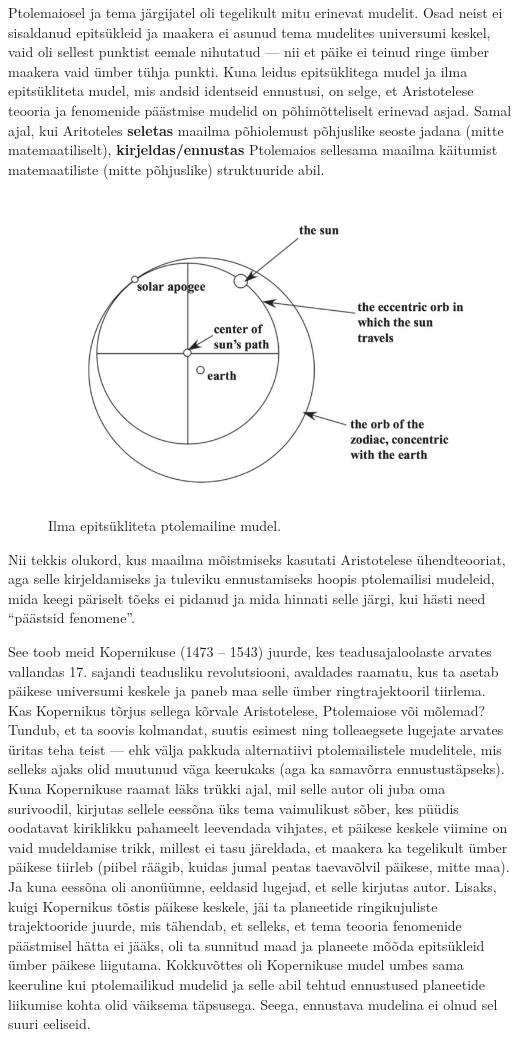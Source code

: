 \documentclass[]{book}
\begin{document}
Ptolemaiosel ja tema järgijatel oli tegelikult mitu erinevat mudelit.
Osad neist ei sisaldanud epitsükleid ja maakera ei asunud tema mudelites
universumi keskel, vaid oli sellest punktist eemale nihutatud --- nii et
päike ei teinud ringe ümber maakera vaid ümber tühja punkti. Kuna leidus
epitsüklitega mudel ja ilma epitsükliteta mudel, mis andsid identseid
ennustusi, on selge, et Aristotelese teooria ja fenomenide päästmise
mudelid on põhimõtteliselt erinevad asjad. Samal ajal, kui Aritoteles
\textbf{seletas} maailma põhiolemust põhjuslike seoste jadana (mitte
matemaatiliselt), \textbf{kirjeldas/ennustas} Ptolemaios sellesama
maailma käitumist matemaatiliste (mitte põhjuslike) struktuuride abil.

\begin{figure}
\includegraphics[width=0.5\linewidth]{img/pt2} \caption{Ilma epitsükliteta ptolemailine mudel.}\label{fig:unnamed-chunk-3}
\end{figure}

Nii tekkis olukord, kus maailma mõistmiseks kasutati Aristotelese
ühendteooriat, aga selle kirjeldamiseks ja tuleviku ennustamiseks hoopis
ptolemailisi mudeleid, mida keegi päriselt tõeks ei pidanud ja mida
hinnati selle järgi, kui hästi need ``päästsid fenomene''.

See toob meid Kopernikuse (1473 -- 1543) juurde, kes teadusajaloolaste
arvates vallandas 17. sajandi teadusliku revolutsiooni, avaldades
raamatu, kus ta asetab päikese universumi keskele ja paneb maa selle
ümber ringtrajektooril tiirlema. Kas Kopernikus tõrjus sellega kõrvale
Aristotelese, Ptolemaiose või mõlemad? Tundub, et ta soovis kolmandat,
suutis esimest ning tolleaegsete lugejate arvates üritas teha teist ---
ehk välja pakkuda alternatiivi ptolemailistele mudelitele, mis selleks
ajaks olid muutunud väga keerukaks (aga ka samavõrra ennustustäpseks).
Kuna Kopernikuse raamat läks trükki ajal, mil selle autor oli juba oma
surivoodil, kirjutas sellele eessõna üks tema vaimulikust sõber, kes
püüdis oodatavat kiriklikku pahameelt leevendada vihjates, et päikese
keskele viimine on vaid mudeldamise trikk, millest ei tasu järeldada, et
maakera ka tegelikult ümber päikese tiirleb (piibel räägib, kuidas jumal
peatas taevavõlvil päikese, mitte maa). Ja kuna eessõna oli anonüümne,
eeldasid lugejad, et selle kirjutas autor. Lisaks, kuigi Kopernikus
tõstis päikese keskele, jäi ta planeetide ringikujuliste trajektooride
juurde, mis tähendab, et selleks, et tema teooria fenomenide päästmisel
hätta ei jääks, oli ta sunnitud maad ja planeete mõõda epitsükleid ümber
päikese liigutama. Kokkuvõttes oli Kopernikuse mudel umbes sama
keeruline kui ptolemailikud mudelid ja selle abil tehtud ennustused
planeetide liikumise kohta olid väiksema täpsusega. Seega, ennustava
mudelina ei olnud sel suuri eeliseid.
\end{document}
